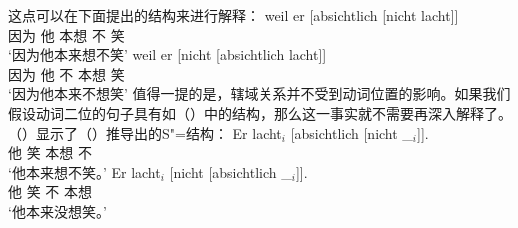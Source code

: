 \begin{enumerate}
{%
}
这点可以在下面提出的结构来进行解释：
\eal
\label{bsp-absichtlich-nicht-anal}
\ex 
\gll weil er [absichtlich [nicht lacht]]\\
	 因为 他 \spacebr{}本想 \spacebr{}不 笑\\
\glt `因为他本来想不笑'
\ex 
\gll weil er [nicht [absichtlich lacht]]\\
     因为 他 \spacebr{}不 \spacebr{}本想 笑\\
\glt `因为他本来不想笑'
\zl
值得一提的是，辖域关系并不受到动词位置的影响。如果我们假设动词二位的句子具有如（）中的结构，那么这一事实就不需要再深入解释了。（）显示了（）推导出的S"=结构：
\eal
\label{bsp-absichtlich-nicht-anal-v1}
\ex 
\gll Er lacht$_i$ [absichtlich [nicht \_$_i$]].\\
     他 笑 \spacebr{}本想 \spacebr{}不\\
\glt `他本来想不笑。'
\ex 
\gll Er lacht$_i$  [nicht [absichtlich \_$_i$]].\\
     他 笑 \spacebr{}不 \spacebr{}本想\\
\glt `他本来没想笑。'
\zl{}
\nocite{Hoehle88a,Hoehle97a}
\end{enumerate}

